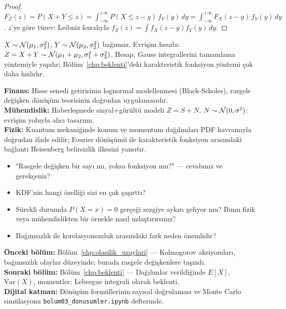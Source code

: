 \begin{proof}
$F_Z(z) = P(X + Y \leq z) = \int_{-\infty}^{+\infty} P(X \leq z - y) \, f_Y(y) \, dy
= \int_{-\infty}^{+\infty} F_X(z-y) \, f_Y(y) \, dy$.
$z$'ye göre türev: Leibniz kuralıyla $f_Z(z) = \int f_X(z-y) f_Y(y) \, dy$.
\end{proof}

\begin{ornek}[Normal + Normal = Normal]
$X \sim \mathcal{N}(\mu_1, \sigma_1^2)$, $Y \sim \mathcal{N}(\mu_2, \sigma_2^2)$ bağımsız.
Evrişim hesabı: $Z = X + Y \sim \mathcal{N}(\mu_1+\mu_2, \sigma_1^2+\sigma_2^2)$.
Hesap, Gauss integrallerini tamamlama yöntemiyle yapılır;
Bölüm~\ref{chp:beklenti}'deki karakteristik fonksiyon yöntemi çok daha hızlıdır.
\end{ornek}

\begin{kopru}
\textbf{Finans:} Hisse senedi getirisinin lognormal modellenmesi (Black-Scholes),
rasgele değişken dönüşüm teorisinin doğrudan uygulamasıdır.\\
\textbf{Mühendislik:} Haberleşmede sinyal+gürültü modeli $Z = S + N$,
$N \sim \mathcal{N}(0, \sigma^2)$: evrişim yoluyla alıcı tasarımı.\\
\textbf{Fizik:} Kuantum mekaniğinde konum ve momentum dağılımları
PDF kavramıyla doğrudan ifade edilir; Fourier dönüşümü ile karakteristik
fonksiyon arasındaki bağlantı Heisenberg belirsizlik ilkesini yansıtır.
\end{kopru}

\begin{ozyansima}
\begin{itemize}
  \item "Rasgele değişken bir sayı mı, yoksa fonksiyon mu?" --- cevabınız ve gerekçeniz?
  \item KDF'nin hangi özelliği sizi en çok şaşırttı?
  \item Sürekli durumda $P(X = x) = 0$ gerçeği sezgiye aykırı geliyor mu?
        Bunu fizik veya mühendislikten bir örnekle nasıl uzlaştırırsınız?
  \item Bağımsızlık ile korelasyonsuzluk arasındaki fark neden önemlidir?
\end{itemize}
\end{ozyansima}

\begin{kopru}
\textbf{Önceki bölüm:} Bölüm~\ref{chp:olasilik_uzaylari} --- Kolmogorov aksiyomları,
bağımsızlık olaylar düzeyinde; burada rasgele değişkenlere taşındı.\\
\textbf{Sonraki bölüm:} Bölüm~\ref{chp:beklenti} --- Dağılımlar verildiğinde
$E[X]$, $\mathrm{Var}(X)$, momentler; Lebesgue integrali olarak beklenti.\\
\textbf{Dijital katman:} Dönüşüm formüllerinin sayısal doğrulaması ve
Monte Carlo simülasyonu \texttt{bolum03\_donusumler.ipynb} defterinde.
\end{kopru}

